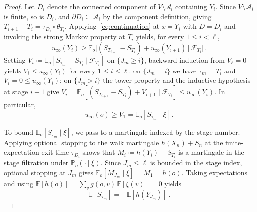 \documentclass[11pt]{amsart}
\theoremstyle{plain}
\theoremstyle{definition}
\newcommand{\E}{\mathbb{E}}
\renewcommand{\P}{\mathbb{P}}
\begin{document}
\begin{proof}
		Let $D_i$ denote the connected component of $V\setminus\mathcal{A}_i$ containing $Y_i$. Since $V\setminus\mathcal{A}_i$ is finite, so is $D_i$, and $\partial D_i\subseteq\mathcal{A}_i$ by the component definition, giving $T_{i+1}-T_i=\tau_{D_i}\circ\theta_{T_i}$. Applying~\eqref{eq:continuation} at $x=Y_i$ with $D=D_i$ and invoking the strong Markov property at $T_i$ yields, for every $1\leq i<\ell$,
		\[
		u_\infty(Y_i)\geq\E_o\bigl[(S_{T_{i+1}}-S_{T_i})+u_\infty(Y_{i+1})\,\big|\,\mathcal{F}_{T_i}\bigr]\,.
		\]
		Setting $V_i\coloneqq\E_o[S_{\tau_m}-S_{T_i}\mid\mathcal{F}_{T_i}]$ on $\{J_m\geq i\}$, backward induction from $V_\ell=0$ yields $V_i\leq u_\infty(Y_i)$ for every $1\leq i\leq\ell$: on $\{J_m=i\}$ we have $\tau_m=T_i$ and $V_i=0\leq u_\infty(Y_i)$; on $\{J_m>i\}$ the tower property and the inductive hypothesis at stage $i+1$ give $V_i=\E_o[(S_{T_{i+1}}-S_{T_i})+V_{i+1}\mid\mathcal{F}_{T_i}]\leq u_\infty(Y_i)$. In particular,
		\begin{equation}\label{eq:stage-bound}
			u_\infty(o)\geq V_1=\E_o[S_{\tau_m}\mid\xi]\,.
		\end{equation}

		To bound $\E_o[S_{\tau_m}\mid\xi]$, we pass to a martingale indexed by the stage number. Applying optional stopping to the walk martingale $h(X_n)+S_n$ at the finite-expectation exit time $\tau_{D_i}$ shows that $M_i\coloneqq h(Y_i)+S_{T_i}$ is a martingale in the stage filtration under $\P_o(\cdot\mid\xi)$. Since $J_m\leq\ell$ is bounded in the stage index, optional stopping at $J_m$ gives $\E_o[M_{J_m}\mid\xi]=M_1=h(o)$. Taking expectations and using $\E[h(o)]=\sum_v g(o,v)\,\E[\xi(v)]=0$ yields
		\begin{equation}\label{eq:payoff-identity}
			\E[S_{\tau_m}]=-\E[h(Y_{J_m})]\,.
		\end{equation}


\end{proof}
\end{document}
